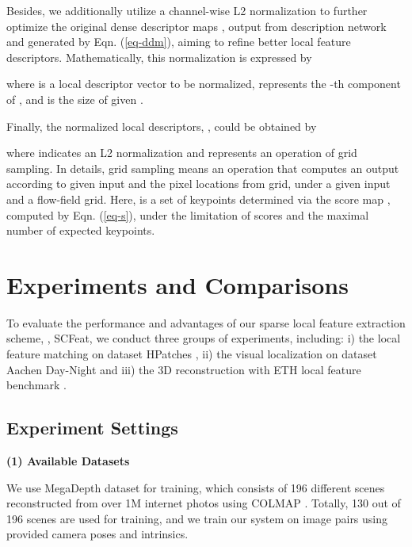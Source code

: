 \documentclass[journal]{IEEEtran}
\begin{document}
Besides, we additionally utilize a channel-wise L2 normalization to further optimize the original dense descriptor maps , output from description network and generated by Eqn. (\ref{eq-ddm}),
 aiming to refine better local feature descriptors. 
Mathematically, this normalization is expressed by

where  is a local descriptor vector to be normalized,  represents the -th component of , and  is the size of given .

Finally, the normalized local descriptors, , could be obtained by

where  indicates an L2 normalization and  represents an operation of grid sampling. In details, grid sampling means an operation that computes an output according to given input and the pixel locations from grid, under a given input and a flow-field grid. Here,  is a set of keypoints determined via the score map , computed by Eqn. (\ref{eq-s}), under the limitation of scores and the maximal number of expected keypoints.

\section{Experiments and Comparisons}

To evaluate the performance and advantages of our sparse local feature extraction scheme, , SCFeat, we conduct three groups of experiments, including: i) the local feature matching on dataset HPatches \cite{HPatches}, ii) the visual localization on dataset Aachen Day-Night \cite{aachen} and iii) the 3D reconstruction with ETH local feature benchmark \cite{ETH}.









\subsection{Experiment Settings}



\textbf{(1) Available Datasets}

We use MegaDepth dataset 
\cite{MegaDepthLi18} for training, which consists of 196 different scenes reconstructed from over 1M internet photos using COLMAP \cite{schoenberger2016sfm,schoenberger2016mvs}. Totally, 130 out of 196 scenes are used for training, and we train our system on image pairs using provided camera poses and intrinsics.  
\end{document}
